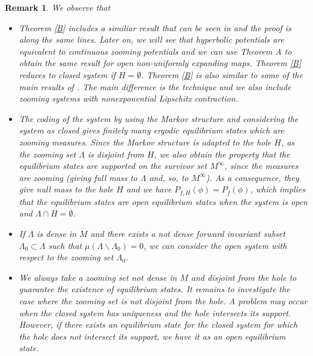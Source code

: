 \documentclass[12pt,a4paper]{amsart}
\theoremstyle{plain}
\newtheorem{remark}{Remark}[subsection]
\begin{document}
\begin{remark}\label{remark} We observe that
	\begin{itemize}	
		\item Theorem \ref{B} includes a similiar result that can be seen in \cite{AOS} and the proof is along the same lines. Later on, we will see that hyperbolic potentials are equivalent to continuous zooming potentials and we can use \cite{S}{Theorem A} to obtain the same result for open non-uniformly expanding maps. Theorem \ref{B} reduces to closed system if $H = \emptyset$. Theorem \ref{B} is also similar to some of the main results of \cite{PV}. The main difference is the technique and we also include zooming systems with nonexponential Lipschitz contraction.
		
		\item The coding of the system by using the Markov structure and considering the system as closed gives finitely many ergodic equilibrium states which are zooming measures. Since the Markov structure is adapted to the hole $H$, as the zooming set $\Lambda$ is disjoint from $H$, we also obtain the property that the equilibrium states are supported on the survivor set $M^{\infty}$, since the measures are zooming (giving full mass to $\Lambda$ and, so, to $M^{\infty}$). As a consequence, they give null mass to the hole $H$ and we have $P_{f,H}(\phi) = P_{f}(\phi)$, which implies that the equilibrium states are open equilibrium states when the system is open and $\Lambda \cap H = \emptyset$. 
		
		
		\item If $\Lambda$ is dense in $M$ and there exists a not dense forward invariant subset $\Lambda_{0} \subset \Lambda$ such that $\mu(\Lambda \backslash \Lambda_{0}) = 0$, we can consider the open system with respect to the zooming set $\Lambda_{0}$.
		
		\item We always take a zooming set not dense in $M$ and disjoint from the hole to guarantee the existence of equilibrium states. It remains to investigate the case where the zooming set is not disjoint from the hole. A problem may occur when the closed system has uniqueness and the hole intersects its support. However, if there exists an equilibrium state for the closed system for which the hole does not intersect its support, we have it as an open equilibrium state.
	\end{itemize}
\end{remark}
\end{document}
